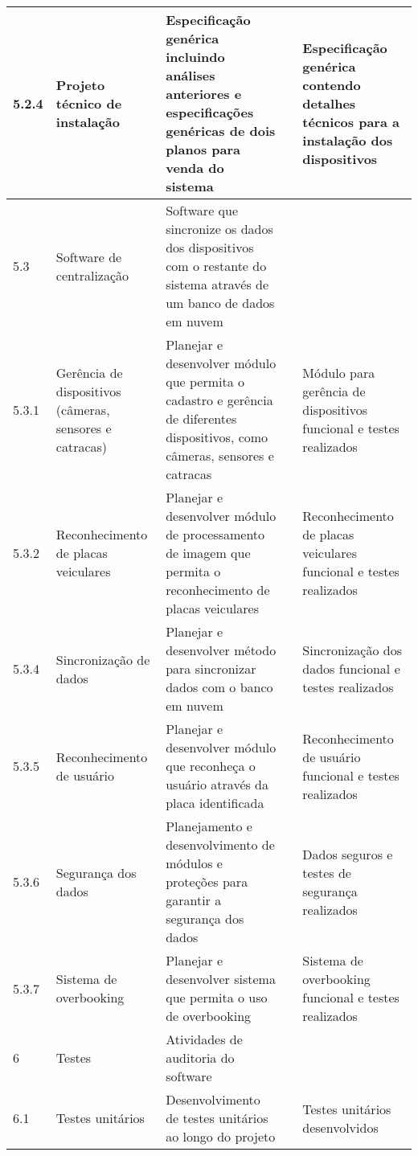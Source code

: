 \begin{longtable}{ l  p{}  p{}  l  p{}  }
		\midrule
		5.2.4       & Projeto técnico de instalação                          & Especificação genérica incluindo análises anteriores e especificações genéricas de dois planos para venda do sistema &                   & Especificação genérica contendo detalhes técnicos para a instalação dos dispositivos \\*
		\midrule
		5.3         & Software de centralização                               & Software que sincronize os dados dos dispositivos com o restante do sistema através de um banco de dados em nuvem &                   & \\*
		\midrule
		5.3.1       & Gerência de dispositivos (câmeras, sensores e catracas) & Planejar e desenvolver módulo que permita o cadastro e gerência de diferentes dispositivos, como câmeras, sensores e catracas &                   & Módulo para gerência de dispositivos funcional e testes realizados \\*
		\midrule
		5.3.2       & Reconhecimento de placas veiculares                       & Planejar e desenvolver módulo de processamento de imagem que permita o reconhecimento de placas veiculares &                   & Reconhecimento de placas veiculares funcional e testes realizados \\*
		\midrule
		5.3.4       & Sincronização de dados                                  & Planejar e desenvolver método para sincronizar dados com o banco em nuvem &                   & Sincronização dos dados funcional e testes realizados \\*
		\midrule
		5.3.5       & Reconhecimento de usuário                                & Planejar e desenvolver módulo que reconheça o usuário através da placa identificada &                   & Reconhecimento de usuário funcional e testes realizados \\*
		\midrule
		5.3.6       & Segurança dos dados                                      & Planejamento e desenvolvimento de módulos e proteções para garantir a segurança dos dados &                   & Dados seguros e testes de segurança realizados \\*
		\midrule
		5.3.7       & Sistema de overbooking                                    & Planejar e desenvolver sistema que permita o uso de overbooking &                   & Sistema de overbooking funcional e testes realizados \\*
		\midrule
		6           & Testes                                                 & Atividades de auditoria do software & & \\*
		\midrule
		6.1         & Testes unitários                                         & Desenvolvimento de testes unitários ao longo do projeto &                   & Testes unitários desenvolvidos \\*

\end{longtable}
